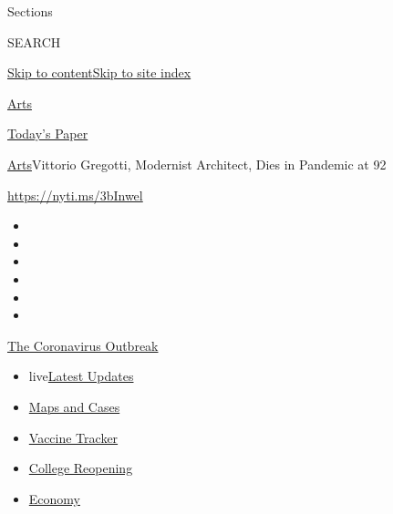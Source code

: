 Sections

SEARCH

\protect\hyperlink{site-content}{Skip to
content}\protect\hyperlink{site-index}{Skip to site index}

\href{https://www.nytimes.com/section/arts}{Arts}

\href{https://myaccount.nytimes.com/auth/login?response_type=cookie\&client_id=vi}{}

\href{https://www.nytimes.com/section/todayspaper}{Today's Paper}

\href{/section/arts}{Arts}\textbar{}Vittorio Gregotti, Modernist
Architect, Dies in Pandemic at 92

\url{https://nyti.ms/3bInwel}

\begin{itemize}
\item
\item
\item
\item
\item
\item
\end{itemize}

\href{https://www.nytimes.com/news-event/coronavirus?action=click\&pgtype=Article\&state=default\&region=TOP_BANNER\&context=storylines_menu}{The
Coronavirus Outbreak}

\begin{itemize}
\tightlist
\item
  live\href{https://www.nytimes.com/2020/08/03/world/coronavirus-covid-19.html?action=click\&pgtype=Article\&state=default\&region=TOP_BANNER\&context=storylines_menu}{Latest
  Updates}
\item
  \href{https://www.nytimes.com/interactive/2020/us/coronavirus-us-cases.html?action=click\&pgtype=Article\&state=default\&region=TOP_BANNER\&context=storylines_menu}{Maps
  and Cases}
\item
  \href{https://www.nytimes.com/interactive/2020/science/coronavirus-vaccine-tracker.html?action=click\&pgtype=Article\&state=default\&region=TOP_BANNER\&context=storylines_menu}{Vaccine
  Tracker}
\item
  \href{https://www.nytimes.com/2020/08/02/us/covid-college-reopening.html?action=click\&pgtype=Article\&state=default\&region=TOP_BANNER\&context=storylines_menu}{College
  Reopening}
\item
  \href{https://www.nytimes.com/live/2020/08/03/business/stock-market-today-coronavirus?action=click\&pgtype=Article\&state=default\&region=TOP_BANNER\&context=storylines_menu}{Economy}
\end{itemize}

